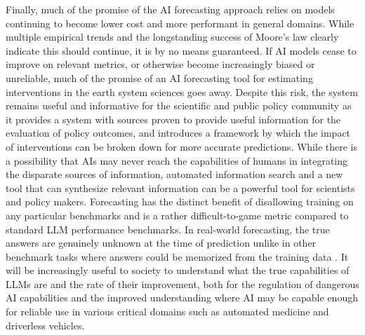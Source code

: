 \documentclass[12pt,a4paper]{article}
\begin{document}
Finally, much of the promise of the AI forecasting approach relies on models continuing to become lower cost and more performant in general domains. While multiple empirical trends and the longstanding success of Moore's law clearly indicate this should continue, it is by no means guaranteed. If AI models cease to improve on relevant metrics, or otherwise become increasingly biased or unreliable, much of the promise of an AI forecasting tool for estimating interventions in the earth system sciences goes away. Despite this risk, the system remains useful and informative for the scientific and public policy community as it provides a system with sources proven to provide useful information for the evaluation of policy outcomes, and introduces a framework by which the impact of interventions can be broken down for more accurate predictions. While there is a possibility that AIs may never reach the capabilities of humans in integrating the disparate sources of information, automated information search and a new tool that can synthesize relevant information can be a powerful tool for scientists and policy makers.
Forecasting has the distinct benefit of disallowing training on any particular benchmarks and is a rather difficult-to-game metric compared to standard LLM performance benchmarks. In real-world forecasting, the true answers are genuinely unknown at the time of prediction unlike in other benchmark tasks where answers could be memorized from the training data . It will be increasingly useful to society to understand what the true capabilities of LLMs are and the rate of their improvement, both for the regulation of dangerous AI capabilities and the improved understanding where AI may be capable enough for reliable use in various critical domains such as automated medicine and driverless vehicles.
\end{document}
